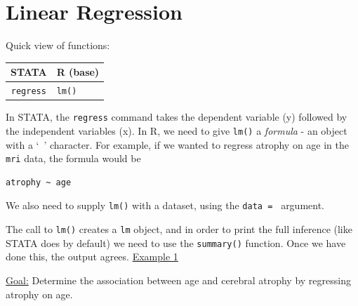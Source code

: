 \documentclass[landscape]{article}
\begin{document}
\section{Linear Regression}
Quick view of functions:\\
\begin{tabular}{c|l}
STATA & R (base) \\
\hline
\texttt{regress} & \texttt{lm()}
\end{tabular}

In STATA, the \texttt{regress} command takes the dependent variable (y) followed by the independent variables (x). In R, we need to give \texttt{lm()} a \emph{formula} - an object with a `~' character. For example, if we wanted to regress atrophy on age in the \texttt{mri} data, the formula would be 
\begin{verbatim}
atrophy ~ age
\end{verbatim}
We also need to supply \texttt{lm()} with a dataset, using the \texttt{data = } argument. 

The call to \texttt{lm()} creates a \texttt{lm} object, and in order to print the full inference (like STATA does by default) we need to use the \texttt{summary()} function. Once we have done this, the output agrees.
\newline
\noindent \underline{Example 1}

\underline{Goal:} Determine the association between age and cerebral atrophy by regressing atrophy on age.
\end{document}
